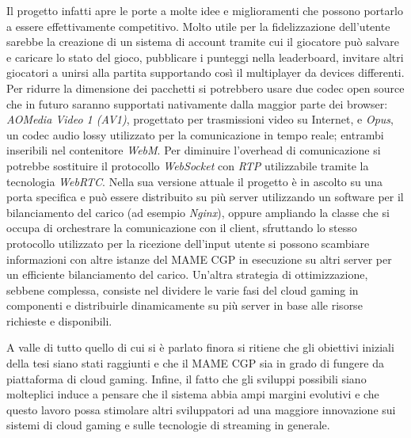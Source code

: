 Il progetto infatti apre le porte a molte idee e miglioramenti che possono portarlo a essere effettivamente competitivo. Molto utile per la fidelizzazione dell'utente sarebbe la creazione di un sistema di account tramite cui il giocatore può salvare e caricare lo stato del gioco, pubblicare i punteggi nella leaderboard, invitare altri giocatori a unirsi alla partita supportando così il multiplayer da devices differenti. Per ridurre la dimensione dei pacchetti si potrebbero usare due codec open source che in futuro saranno supportati nativamente dalla maggior parte dei browser: \textit{AOMedia Video 1 (AV1)}, progettato per trasmissioni video su Internet, e \textit{Opus}, un codec audio lossy utilizzato per la comunicazione in tempo reale; entrambi inseribili nel contenitore \textit{WebM}. Per diminuire l'overhead di comunicazione si potrebbe sostituire il protocollo \textit{WebSocket} con \textit{RTP} utilizzabile tramite la tecnologia \textit{WebRTC}. Nella sua versione attuale il progetto è in ascolto su una porta specifica e può essere distribuito su più server utilizzando un software per il bilanciamento del carico (ad esempio \textit{Nginx}), oppure ampliando la classe che si occupa di orchestrare la comunicazione con il client, sfruttando lo stesso protocollo utilizzato per la ricezione dell'input utente si possono scambiare informazioni con altre istanze del MAME CGP in esecuzione su altri server per un efficiente bilanciamento del carico. Un'altra strategia di ottimizzazione, sebbene complessa, consiste nel dividere le varie fasi del cloud gaming in componenti e distribuirle dinamicamente su più server in base alle risorse richieste e disponibili.

A valle di tutto quello di cui si è parlato finora si ritiene che gli obiettivi iniziali della tesi siano stati raggiunti e che il MAME CGP sia in grado di fungere da piattaforma di cloud gaming. Infine, il fatto che gli sviluppi possibili siano molteplici induce a pensare che il sistema abbia ampi margini evolutivi e che questo lavoro possa stimolare altri sviluppatori ad una maggiore innovazione sui sistemi di cloud gaming e sulle tecnologie di streaming in generale.
